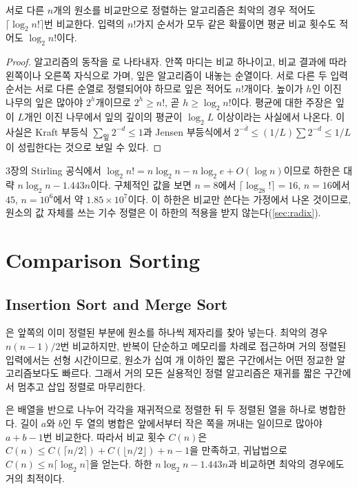 \begin{theorem}
\label{thm:sort-lower-bound}
서로 다른 $n$개의 원소를 비교만으로 정렬하는 알고리즘은 최악의 경우 적어도 $\lceil\log_2n!\rceil$번 비교한다. 입력의 $n!$가지 순서가 모두 같은 확률이면 평균 비교 횟수도 적어도 $\log_2n!$이다.
\end{theorem}

\begin{proof}
알고리즘의 동작을 로 나타내자. 안쪽 마디는 비교 하나이고, 비교 결과에 따라 왼쪽이나 오른쪽 자식으로 가며, 잎은 알고리즘이 내놓는 순열이다. 서로 다른 두 입력 순서는 서로 다른 순열로 정렬되어야 하므로 잎은 적어도 $n!$개이다. 높이가 $h$인 이진 나무의 잎은 많아야 $2^h$개이므로 $2^h\ge n!$, 곧 $h\ge\log_2n!$이다. 평균에 대한 주장은 잎이 $L$개인 이진 나무에서 잎의 깊이의 평균이 $\log_2L$ 이상이라는 사실에서 나온다. 이 사실은 Kraft 부등식 $\sum_{\text{잎}}2^{-d}\le1$과 Jensen 부등식에서 $2^{-\bar d}\le(1/L)\sum2^{-d}\le1/L$이 성립한다는 것으로 보일 수 있다.
\end{proof}

3장의 Stirling 공식에서 $\log_2n!=n\log_2n-n\log_2e+O(\log n)$이므로 하한은 대략 $n\log_2n-1.443n$이다. 구체적인 값을 보면 $n=8$에서 $\lceil\log_28!\rceil=16$, $n=16$에서 $45$, $n=10^6$에서 약 $1.85\times10^7$이다. 이 하한은 비교만 쓴다는 가정에서 나온 것이므로, 원소의 값 자체를 쓰는 기수 정렬은 이 하한의 적용을 받지 않는다(\cref{sec:radix}).

\section{Comparison Sorting}
\label{sec:comparison-sorts}

\subsection{Insertion Sort and Merge Sort}

은 앞쪽의 이미 정렬된 부분에 원소를 하나씩 제자리를 찾아 넣는다. 최악의 경우 $n(n-1)/2$번 비교하지만, 반복이 단순하고 메모리를 차례로 접근하며 거의 정렬된 입력에서는 선형 시간이므로, 원소가 십여 개 이하인 짧은 구간에서는 어떤 정교한 알고리즘보다도 빠르다. 그래서 거의 모든 실용적인 정렬 알고리즘은 재귀를 짧은 구간에서 멈추고 삽입 정렬로 마무리한다.

은 배열을 반으로 나누어 각각을 재귀적으로 정렬한 뒤 두 정렬된 열을 하나로 병합한다. 길이 $a$와 $b$인 두 열의 병합은 앞에서부터 작은 쪽을 꺼내는 일이므로 많아야 $a+b-1$번 비교한다. 따라서 비교 횟수 $C(n)$은 $C(n)\le C(\lceil n/2\rceil)+C(\lfloor n/2\rfloor)+n-1$을 만족하고, 귀납법으로 $C(n)\le n\lceil\log_2n\rceil$을 얻는다. 하한 $n\log_2n-1.443n$과 비교하면 최악의 경우에도 거의 최적이다.

